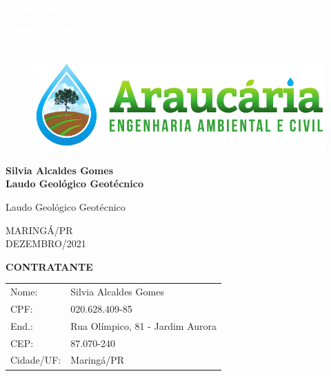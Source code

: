 \vfill

\begin{flushright}
\begin{minipage}[h]{8cm}
{\footnotesize \textcolor{white}{Laudo Geológico Geotécnico }}
\end{minipage}
\end{flushright}

\vfill

\begin{center}
{\large \textcolor{white} {
{MARINGÁ/PR\\
DEZEMBRO/2021}}
}
\end{center}
\newpage

\thispagestyle{empty}
\begin{figure}[t!]
\centering
\includegraphics[width = 7 cm]{./imagens/logo.pdf}
\end{figure}
\mbox{} 
\vspace{6.5cm}

\begin{center}
{\Large \bfseries
Silvia Alcaldes Gomes\\
Laudo Geológico Geotécnico
}
\end{center}

\vfill

\begin{flushright}
\begin{minipage}[h]{8cm}
{\footnotesize{Laudo Geológico Geotécnico }}
\end{minipage}
\end{flushright}

\vfill

\begin{center}
{\large 
{MARINGÁ/PR\\
DEZEMBRO/2021}
}
\end{center}

\clearpage

\thispagestyle{empty}


\textbf{CONTRATANTE} \\


\begin{tabular}{p{4cm} p{11cm}}
Nome: & Silvia Alcaldes Gomes\\
CPF: & 020.628.409-85\\
End.: &Rua Olímpico, 81 - Jardim Aurora\\
CEP:  & 87.070-240\\
Cidade/UF:  & Maringá/PR\\
\end{tabular}
\vfill

